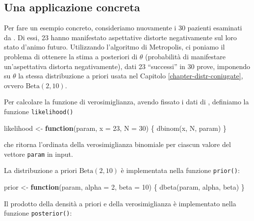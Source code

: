 \documentclass[
  10pt,
  italian,
  a4paper,
  extrafontsizes,onecolumn,openright
  ]{memoir}
\newenvironment{Shaded}{\begin{snugshade}}{\end{snugshade}}
\newcommand{\AttributeTok}[1]{\textcolor[rgb]{0.77,0.63,0.00}{#1}}
\newcommand{\ControlFlowTok}[1]{\textcolor[rgb]{0.13,0.29,0.53}{\textbf{#1}}}
\newcommand{\DecValTok}[1]{\textcolor[rgb]{0.00,0.00,0.81}{#1}}
\newcommand{\FunctionTok}[1]{\textcolor[rgb]{0.00,0.00,0.00}{#1}}
\newcommand{\NormalTok}[1]{#1}
\newcommand{\OtherTok}[1]{\textcolor[rgb]{0.56,0.35,0.01}{#1}}
\begin{document}
\hypertarget{una-applicazione-concreta}{%
\subsection{Una applicazione concreta}\label{una-applicazione-concreta}}

Per fare un esempio concreto, consideriamo nuovamente i 30 pazienti esaminati da \textcite{zetschefuture2019}. Di essi, 23 hanno manifestato aspettative distorte negativamente sul loro stato d'animo futuro. Utilizzando l'algoritmo di Metropolis, ci poniamo il problema di ottenere la stima a posteriori di \(\theta\) (probabilità di manifestare un'aspettativa distorta negativamente), dati 23 ``successi'' in 30 prove, imponendo su \(\theta\) la stessa distribuzione a priori usata nel Capitolo \ref{chapter-distr-coniugate}, ovvero \(\mbox{Beta}(2, 10)\).

Per calcolare la funzione di verosimiglianza, avendo fissato i dati di \textcite{zetschefuture2019}, definiamo la funzione \texttt{likelihood()}

\begin{Shaded}
\begin{Highlighting}[]
\NormalTok{likelihood }\OtherTok{\textless{}{-}} \ControlFlowTok{function}\NormalTok{(param, }\AttributeTok{x =} \DecValTok{23}\NormalTok{, }\AttributeTok{N =} \DecValTok{30}\NormalTok{) \{}
  \FunctionTok{dbinom}\NormalTok{(x, N, param)}
\NormalTok{\}}
\end{Highlighting}
\end{Shaded}

\noindent
che ritorna l'ordinata della verosimiglianza binomiale per ciascun valore del vettore \texttt{param} in input.

La distribuzione a priori \(\mbox{Beta}(2, 10)\) è implementata nella funzione \texttt{prior()}:

\begin{Shaded}
\begin{Highlighting}[]
\NormalTok{prior }\OtherTok{\textless{}{-}} \ControlFlowTok{function}\NormalTok{(param, }\AttributeTok{alpha =} \DecValTok{2}\NormalTok{, }\AttributeTok{beta =} \DecValTok{10}\NormalTok{) \{}
  \FunctionTok{dbeta}\NormalTok{(param, alpha, beta) }
\NormalTok{\}}
\end{Highlighting}
\end{Shaded}

Il prodotto della densità a priori e della verosimiglianza è implementato nella funzione \texttt{posterior()}:
\end{document}
